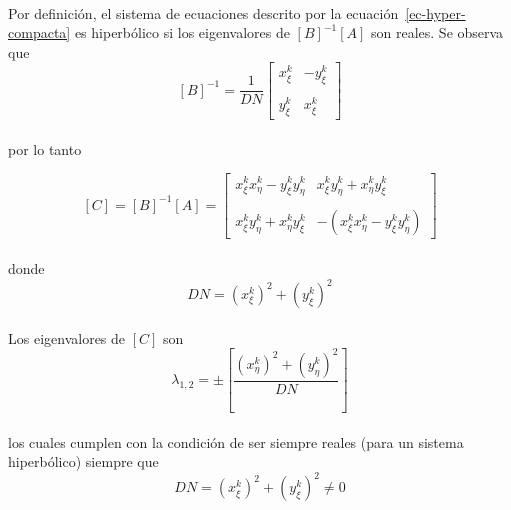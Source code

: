 \documentclass[letterpaper, openright, 12pt]{book}
\begin{document}
    \paragraph*{}
    Por definición, el sistema de ecuaciones descrito por la
    ecuación~\ref{ec-hyper-compacta} es hiperbólico si los eigenvalores de
    $\left[ B \right]^{-1} \left[ A \right]$ son reales. Se observa que\\
    \begin{equation*}
        \left[ B \right]^{-1} = \frac{1}{DN}\begin{bmatrix}
        x_{\xi}^{k} & -y_{\xi}^{k} \\ \\
        y_{\xi}^{k} & x_{\xi}^{k}
        \end{bmatrix}
    \end{equation*}\\
    por lo tanto

    \begin{equation*}
        \left[ C \right] = \left[ B \right]^{-1} \left[ A \right] =
        \begin{bmatrix}
        x_{\xi}^{k} x_{\eta}^{k} - y_{\xi}^{k} y_{\eta}^{k} &
        x_{\xi}^{k} y_{\eta}^{k} + x_{\eta}^{k} y_{\xi}^{k} \\ \\
        x_{\xi}^{k} y_{\eta}^{k} + x_{\eta}^{k} y_{\xi}^{k} &
        - \left( x_{\xi}^{k} x_{\eta}^{k} - y_{\xi}^{k} y_{\eta}^{k} \right)
        \end{bmatrix}
    \end{equation*}\\

    donde
    \begin{equation*}
        DN = \left( x_{\xi}^{k} \right)^2 + \left( y_{\xi}^{k} \right)^2
    \end{equation*}

    \paragraph*{}
    Los eigenvalores de $\left[ C \right]$ son
    \begin{equation*}
        \lambda_{1, 2} =
        \pm \left[ \frac{\left(x_{\eta}^{k} \right)^2
                + \left( y_{\eta}^{k} \right)^2} {DN} \right]
    \end{equation*}\\

    los cuales cumplen con la condición de ser siempre reales (para un
    sistema hiperbólico) siempre que
    \begin{equation*}
        DN = \left( x_{\xi}^{k} \right)^2 + \left( y_{\xi}^{k} \right)^2 \neq 0
    \end{equation*}
\end{document}
